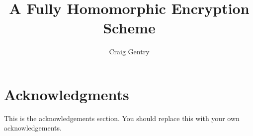 \title{A Fully Homomorphic Encryption Scheme}
\author{Craig Gentry}


\maketitle

\cleardoublepage

\setcounter{savepage}{\thepage}

\begin{abstractpage}

\end{abstractpage}

\cleardoublepage

\section*{Acknowledgments}

This is the acknowledgements section.  You should replace this with your
own acknowledgements.
